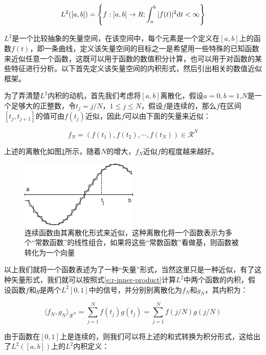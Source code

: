 \begin{equation}
	L^{2}([a,b])=\Biggl\{ f:[a,b]\to R;\int^{b}_a|f(t)|^{2}{\rm d}t<\infty\Biggl\}
\end{equation}

\noindent $L^{2}$是一个比较抽象的矢量空间，在该空间中，每个元素是一个定义在$[a,b]$上的函数$f(t)$，即一条曲线，定义该矢量空间的目标之一是希望用一些特殊的已知函数来近似任意一个函数，这既可以用于函数的数值积分计算，也可以用于对函数的某些特征进行分析。以下首先定义该矢量空间的内积形式，然后引出相关的数值近似框架。

为了弄清楚$L^{2}$内积的动机，首先我们考虑将$[a,b]$离散化，假设$a=0,b=1$,$N$是一个足够大的正整数，令$t_j=j/N$，$1\leq j\leq N$，假设$f$是连续的，那么$f$在区间$[t_j,t_{j+1}]$的值可由$f(t_j)$近似，因此$f$可以由下面的矢量来近似：

\begin{equation}
	f_N=(f(t_1),f(t_2),\cdots,f(t_N))\in \mathcal{R}^{N}
\end{equation}

\noindent 上述的离散化如图\ref{f:r-function-approximation}所示，随着$N$的增大，$f_N$近似$f$的程度越来越好。

\begin{figure}
	\sidecaption
	\includegraphics[width=0.5\textwidth]{figures/r/function-approximation}
	\caption{连续函数由其离散化形式来近似，这种离散化将一个函数表示为多个“常数函数”的线性组合，如果将这些“常数函数”看做基，则函数被转化为一个向量}
	\label{f:r-function-approximation}
\end{figure}

以上我们就将一个函数表述为了一种“矢量”形式，当然这里只是一种近似，有了这种矢量形式，我们就可以按照式\ref{e:r-inner-product}计算$L^{2}$中两个函数的内积，假设函数$f$和$g$是两个$L^{2}[0,1]$中的信号，并分别别离散化为$f_N$和$g_N$，其内积为：

\begin{equation}
	\langle f_N,g_N\rangle_{\mathcal{R}^{N}}=\sum^{N}_{j=1}f(t_j)g(t_j)=\sum^{N}_{j=1}f(j/N)g(j/N)
\end{equation}

\noindent 由于函数在$[0,1]$上是连续的，则我们可以将上述的和式转换为积分形式，这给出了$L^{2}([a,b])$上的$L^{2}$内积定义：

